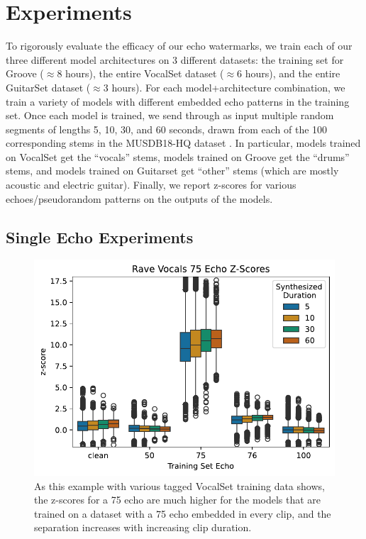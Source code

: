 \documentclass[letterpaper]{article} %
\begin{document}
\section{Experiments}

To rigorously evaluate the efficacy of our echo watermarks, we train each of our three different model architectures on 3 different datasets:  the training set for Groove \cite{groove2019} ($\approx$8 hours), the entire VocalSet dataset \cite{wilkins2018vocalset} ($\approx$6 hours), and the entire GuitarSet dataset \cite{xi2018guitarset} ($\approx$3 hours).  For each model+architecture combination, we train a variety of models with different embedded echo patterns in the training set.  Once each model is trained, we send through as input multiple random segments of lengths 5, 10, 30, and 60 seconds, drawn from each of the 100 corresponding stems in the MUSDB18-HQ dataset \cite{musdb18-hq}.  In particular, models trained on VocalSet get the ``vocals'' stems, models trained on Groove get the ``drums'' stems, and models trained on Guitarset get ``other'' stems (which are mostly acoustic and electric guitar).  Finally, we report z-scores for various echoes/pseudorandom patterns on the outputs of the models.

\subsection{Single Echo Experiments}
\label{sec:experimentssingleecho}


\begin{figure}
    \centering
    \includegraphics[width=\columnwidth]{figs/RaveZScoreExamples.pdf}
    \caption{As this example with various tagged VocalSet training data shows, the z-scores for a 75 echo are much higher for the models that are trained on a dataset with a 75 echo embedded in every clip, and the separation increases with increasing clip duration.}
    \label{fig:ravezscoreexamples}
\end{figure}
\end{document}
